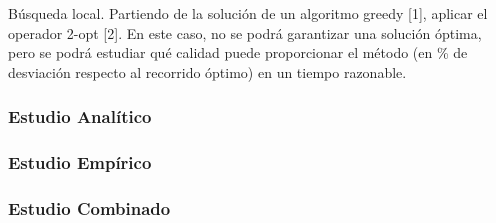 \documentclass{uc3mpracticas}
\begin{document}
  Búsqueda local. Partiendo de la solución de un algoritmo greedy [1], aplicar el operador 2-opt [2]. En este caso, no se podrá garantizar una solución óptima, pero se podrá estudiar qué calidad puede proporcionar el método (en \% de desviación respecto al recorrido óptimo) en un tiempo razonable.

  \subsubsection{Estudio Analítico}

  \subsubsection{Estudio Empírico}

  \subsubsection{Estudio Combinado}
\end{document}
